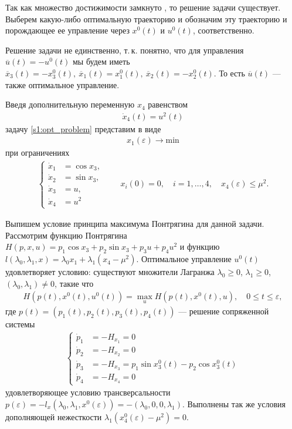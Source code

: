 \documentclass[../main.tex]{subfiles}
\begin{document}
Так как множество достижимости замкнуто \cite{GusZykIFAC}, то решение задачи существует. 
Выберем какую-либо оптимальную траекторию и обозначим эту траекторию и порождающее ее управление через $x^0(t) $ и $ u^0(t) $, соответственно.

Решение задачи не единственно, т.\,к. понятно, что для управления $ \overline{u}(t) = -u^0(t) $ мы будем иметь $ \overline{x}_3(t) = -x_3^0(t), \ \overline{x}_1(t) = x_1^0(t), \ \overline{x}_2(t) = -x_2^0(t) $. 
То есть $ \overline{u}(t) $ --- также оптимальное управление.

Введя дополнительную переменную $ x_4 $ равенством
\begin{gather*}
	\dot{x}_4(t) = u^2(t)
\end{gather*}
задачу \eqref{s1:opt_problem} представим в виде
\begin{gather*}%
	x_1(\varepsilon) \rightarrow \mathrm{min}
\end{gather*}
при ограничениях
\begin{gather}\label{s1:system2}
	\left\{
	\begin{aligned}
		\dot{x}_1 &= \cos x_3, \\
		\dot{x}_2 &= \sin x_3, \\
		\dot{x}_3 &= u, \\
		\dot{x}_4 &= u^2
	\end{aligned}
	\right.
	\qquad
	x_i(0) = 0, \quad i = 1, \dots, 4,
	\quad
	{x_4}\left( \varepsilon \right) \le {\mu ^2}.
\end{gather}

Выпишем условие принципа максимума Понтрягина для данной задачи. 
Рассмотрим функцию Понтрягина
$
	H(p,x,u) = p_1 \cos{x_3} + p_2 \sin {x_3} + p_3 u + p_4 u^2
$
и функцию
$
	l(\lambda_0,\lambda_1,x) = \lambda_0 x_1 + \lambda_1 (x_4 - \mu^2).
$
Оптимальное управление $ u^0(t) $ удовлетворяет условию: существуют множители Лагранжа $ \lambda_0 \geq 0 $, $ \lambda_1 \geq 0 $, $ (\lambda_0,\lambda_1) \neq 0 $, такие что
\begin{gather*}
	H(p(t),x^0(t),u^0(t))=\max_u H(p(t),x^0(t),u), \quad 0\leq t \leq \varepsilon,
\end{gather*}
где $ p(t) = \left(p_1(t),p_2(t),p_3(t),p_4(t) \right) $ --- решение сопряженной системы
\begin{gather*}
		\left\{ \begin{aligned}
						\dot{p}_1 &= -H_{x_1} = 0\\
						\dot{p}_2 &= -H_{x_2} = 0\\
						\dot{p}_3 &= -H_{x_3} = p_1 \sin x_3^0(t) - p_2 \cos x_3^0(t)\\
						\dot{p}_4 &= -H_{x_4} = 0
		\end{aligned} \right.
\end{gather*}
удовлетворяющее условию трансверсальности
$
p(\varepsilon) = -l_x(\lambda_0,\lambda_1, x^0(\varepsilon)) = - (\lambda_0,0,0,\lambda_1).
$
Выполнены так же условия дополняющей нежесткости
$\lambda_1 (x_4^0(\varepsilon) - \mu^2) = 0$.
\end{document}
